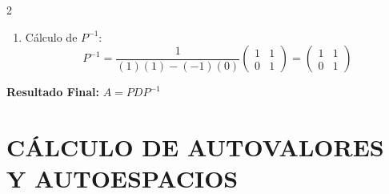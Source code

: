 \documentclass[10pt]{extarticle}
\begin{document}
\begin{multicols}{2}
\begin{enumerate}
\item Cálculo de $P^{-1}$:
$$P^{-1}=\frac{1}{(1)(1)-(-1)(0)}\begin{pmatrix}1&1\\0&1\end{pmatrix}=\begin{pmatrix}1&1\\0&1\end{pmatrix}$$
\end{enumerate}

\textbf{Resultado Final:} $A = PDP^{-1}$

\end{multicols}

\newpage

\section*{CÁLCULO DE AUTOVALORES Y AUTOESPACIOS}
\end{document}
